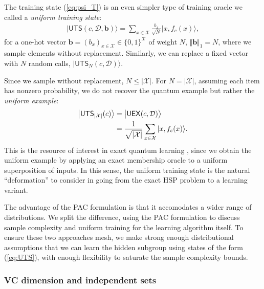 \documentclass[aps, pre,reprint,nofootinbib,citeautoscript,floatfix]{revtex4-1}
\begin{document}
The training state (\ref{eq:psi_T}) is an even simpler
type of training oracle we called a \emph{uniform training state}:
\begin{align}
  \label{eq:UTS}
  \big|\mathsf{UTS}(c, {\mathcal{D}}, \mathbf{b})\big\rangle = \sum_{x
  \in\mathcal{X}} \frac{b_x}{\sqrt{N}} |x, f_c(x)\rangle,
\end{align}
for a one-hot vector $\mathbf{b}=(b_x)_{x\in\mathcal{X}} \in \{0,
1\}^{\mathcal{X}}$ of weight $N$, $\Vert \mathbf{b}\Vert_1 = N$, where
we sample elements without replacement. Similarly, we can replace a
fixed vector with $N$ random calls, $\big|\mathsf{UTS}_N(c,
{\mathcal{D}})\big\rangle$.

Since we sample without replacement, $N \leq |\mathcal{X}|$. For $N =
|\mathcal{X}|$, assuming each item has nonzero probability, we do not
recover the quantum example but rather the
\emph{uniform example}:
\begin{align}
  \big|\mathsf{UTS}_{|\mathcal{X}|}(c)\big\rangle & =
  \big|\mathsf{UEX}(c, {\mathcal{D}})\big\rangle \notag \\ & =
  \frac{1}{\sqrt{|\mathcal{X}|}}\sum_{x\in\mathcal{X}} |x, f_c(x)\rangle.   \label{eq:94}
\end{align}
This is the resource of interest in exact quantum learning
\cite{arunachalam2017survey}, since we obtain the uniform example by
applying an exact membership oracle to a uniform superposition of
inputs.
In this sense, the uniform training state is the natural
``deformation'' to consider in going from the exact HSP problem to a
learning variant.

The advantage of the PAC formulation is that it accomodates a wider
range of distributions. We split the difference, using the PAC
formulation to discuss sample complexity and uniform training
for the learning algorithm itself. To ensure these two
approaches mesh, we make strong enough distributional
assumptions that we can learn the hidden subgroup using states of the
form (\ref{eq:UTS}), with enough flexibility to saturate the sample
complexity bounds.

\subsubsection*{VC dimension and independent sets}
\end{document}
